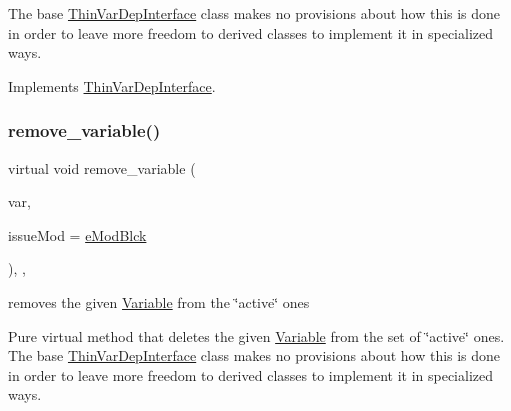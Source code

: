 The base \mbox{\hyperlink{class_s_m_spp__di__unipi__it_1_1_thin_var_dep_interface}{Thin\+Var\+Dep\+Interface}} class makes no provisions about how this is done in order to leave more freedom to derived classes to implement it in specialized ways. 

Implements \mbox{\hyperlink{group___thin_var_dep_interface___c_l_a_s_s_e_s_ga05297a4e506f89ec692a01aca971ce2d}{Thin\+Var\+Dep\+Interface}}.

\mbox{\label{class_s_m_spp__di__unipi__it_1_1_one_var_constraint_ade52d9ebf47de895377b860ef4d3a607}} 
\subsubsection{\texorpdfstring{remove\+\_\+variable()}{remove\_variable()}}
{\footnotesize\ttfamily virtual void remove\+\_\+variable (\begin{DoxyParamCaption}\item[{\mbox{\hyperlink{class_s_m_spp__di__unipi__it_1_1_variable}{Variable}} $\ast$}]{var,  }\item[{\mbox{\hyperlink{group___modification___t_y_p_e_s_ga544246d8c462e9a2d817c2c30797968f}{c\+\_\+\+Mod\+Param}}}]{issue\+Mod = {\ttfamily \mbox{\hyperlink{group___modification___t_y_p_e_s_gga48fddcdd03a03f49b7e389ca1ed938d4a21b14b26b1c0093a0905f6fc010bad29}{e\+Mod\+Blck}}} }\end{DoxyParamCaption})\hspace{0.3cm}{\ttfamily [inline]}, {\ttfamily [override]}, {\ttfamily [virtual]}}



removes the given \mbox{\hyperlink{class_s_m_spp__di__unipi__it_1_1_variable}{Variable}} from the \char`\"{}active\char`\"{} ones 

Pure virtual method that deletes the given \mbox{\hyperlink{class_s_m_spp__di__unipi__it_1_1_variable}{Variable}} from the set of \char`\"{}active\char`\"{} ones. The base \mbox{\hyperlink{class_s_m_spp__di__unipi__it_1_1_thin_var_dep_interface}{Thin\+Var\+Dep\+Interface}} class makes no provisions about how this is done in order to leave more freedom to derived classes to implement it in specialized ways.

